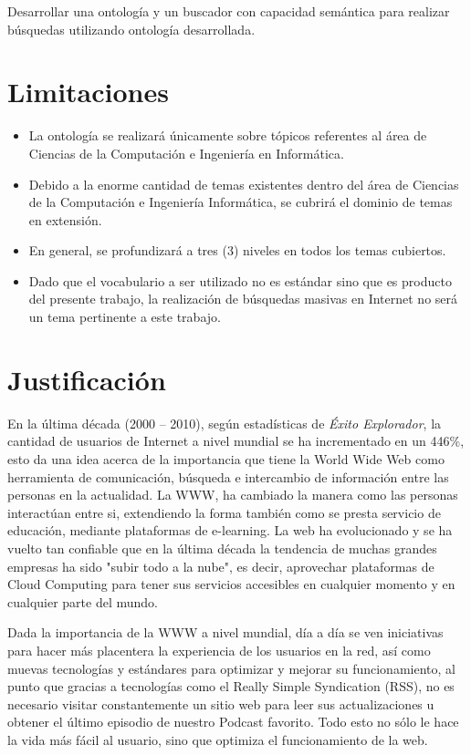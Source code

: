 Desarrollar una ontología y un buscador con capacidad semántica para realizar búsquedas utilizando ontología desarrollada.


\section{Limitaciones }

\begin{itemize}
\item La ontología se realizará únicamente sobre tópicos referentes al área de Ciencias de la Computación e Ingeniería en Informática.
\item Debido a la enorme cantidad de temas existentes dentro del área de Ciencias de la Computación e Ingeniería Informática, se cubrirá el dominio de temas en extensión.
\item En general, se profundizará a tres (3) niveles en todos los temas cubiertos.
\item Dado que el vocabulario a ser utilizado no es estándar sino que es producto del presente trabajo, la realización de búsquedas masivas en Internet no será un tema pertinente a este trabajo.

\end{itemize}

\newpage


\section{Justificación }

En la última década (2000 – 2010), según estadísticas de \textit{Éxito Explorador}, la cantidad de usuarios de Internet a nivel mundial se ha incrementado en un 446\%, esto da una idea acerca de la importancia que tiene la World Wide Web como herramienta de comunicación, búsqueda e intercambio de información entre las personas en la actualidad. La WWW, ha cambiado la manera como las personas interactúan entre si, extendiendo la forma también como se presta servicio de educación, mediante plataformas de e-learning. La web ha evolucionado y se ha vuelto tan confiable que en la última década la tendencia de muchas grandes empresas ha sido "subir todo a la nube", es decir, aprovechar plataformas de Cloud Computing para tener sus servicios accesibles en cualquier momento y en cualquier parte del mundo.

Dada la importancia de la WWW a nivel mundial, día a día se ven iniciativas para hacer más placentera la experiencia de los usuarios en la red, así como muevas tecnologías y estándares para optimizar y mejorar su funcionamiento, al punto que gracias a tecnologías como el Really Simple Syndication (RSS), no es necesario visitar constantemente un sitio web para leer sus actualizaciones u obtener el último episodio de nuestro Podcast favorito. Todo esto no sólo le hace la vida más fácil al usuario, sino que optimiza el funcionamiento de la web.

